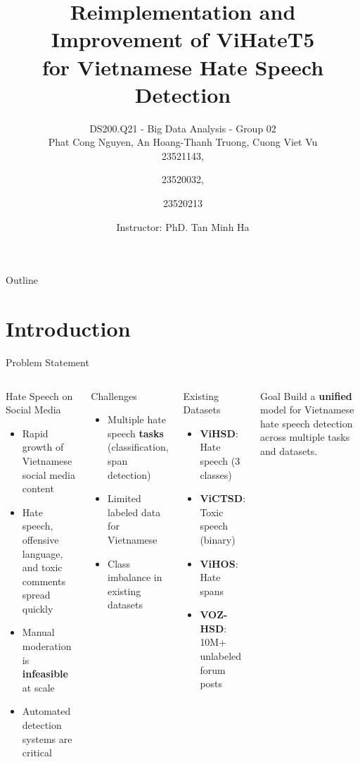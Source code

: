 \documentclass[10pt, aspectratio=169]{beamer}
\title[ViHateT5]{\textbf{Reimplementation and Improvement of ViHateT5 \\ for Vietnamese Hate Speech Detection}}
\author[DS200.Q21]{DS200.Q21 - Big Data Analysis - Group 02 \\  Phat Cong Nguyen, An Hoang-Thanh Truong, Cuong Viet Vu \\ 23521143, \and 23520032, \and 23520213}
\institute[UIT]{University of Information Technology -- VNU-HCM}
\date[\today]{Instructor: PhD. Tan Minh Ha}
\begin{document}
\begin{frame}[plain]
  \titlepage
\end{frame}

\begin{frame}{Outline}
  \tableofcontents
\end{frame}

\section{Introduction}

\begin{frame}[shrink=5]{Problem Statement}
  \begin{columns}[T]
    \begin{block}{Hate Speech on Social Media}
      \begin{itemize}
        \item Rapid growth of Vietnamese social media content
        \item Hate speech, offensive language, and toxic comments spread quickly
        \item Manual moderation is \textbf{infeasible} at scale
        \item Automated detection systems are critical
      \end{itemize}
    \end{block}
    \vspace{0.3cm}
    \begin{alertblock}{Challenges}
      \begin{itemize}
        \item Multiple hate speech \textbf{tasks} (classification, span detection)
        \item Limited labeled data for Vietnamese
        \item Class imbalance in existing datasets
      \end{itemize}
    \end{alertblock}

    \begin{exampleblock}{Existing Datasets}
      \begin{itemize}
        \item \textbf{ViHSD}: Hate speech (3 classes)
        \item \textbf{ViCTSD}: Toxic speech (binary)
        \item \textbf{ViHOS}: Hate spans
        \item \textbf{VOZ-HSD}: 10M+ unlabeled forum posts
      \end{itemize}
    \end{exampleblock}
    \vspace{0.3cm}
    \begin{block}{Goal}
      Build a \textbf{unified} model for Vietnamese hate speech detection across multiple tasks and datasets.
    \end{block}
  \end{columns}
\end{frame}
\end{document}
